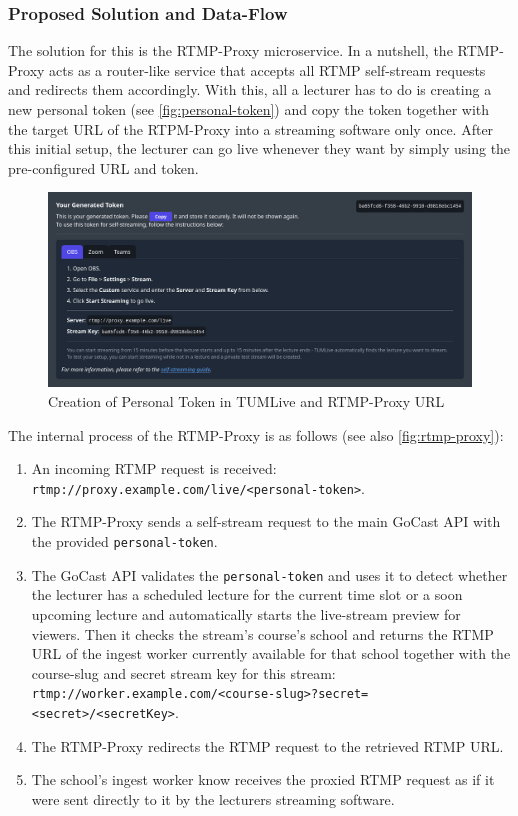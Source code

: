 \subsubsection{Proposed Solution and Data-Flow}

The solution for this is the RTMP-Proxy microservice. In a nutshell, the RTMP-Proxy acts as a router-like service that accepts all \ac{RTMP} self-stream requests and redirects them accordingly. With this, all a lecturer has to do is creating a new personal token (see \autoref{fig:personal-token}) and copy the token together with the target URL of the RTPM-Proxy into a streaming software only once.
After this initial setup, the lecturer can go live whenever they want by simply using the pre-configured URL and token.

\begin{figure}[htpb]
    \centering
    \includegraphics[width=\textwidth]{images/PersonalToken.png}
    \caption[Creation of Personal Token in TUMLive and RTMP-Proxy URL]{Creation of Personal Token in TUMLive and RTMP-Proxy URL}\label{fig:personal-token}
\end{figure}


The internal process of the RTMP-Proxy is as follows (see also \autoref{fig:rtmp-proxy}): 

\begin{enumerate}
    \item An incoming \ac{RTMP} request is received:\\
    \texttt{rtmp://proxy.example.com/live/<personal-token>}.
    \item The RTMP-Proxy sends a self-stream request to the main GoCast \ac{API} with the provided \texttt{personal-token}.
    \item The GoCast \ac{API} validates the \texttt{personal-token} and uses it to detect whether the lecturer has a scheduled lecture for the current time slot or a soon upcoming lecture and automatically starts the live-stream preview for viewers. Then it checks the stream's course's school and returns the \ac{RTMP} URL of the ingest worker currently available for that school together with the course-slug and secret stream key for this stream: \\ 
    \texttt{rtmp://worker.example.com/<course-slug>?secret=<secret>/<secretKey>}.
    \item The RTMP-Proxy redirects the \ac{RTMP} request to the retrieved \ac{RTMP} URL.
    \item The school's ingest worker know receives the proxied \ac{RTMP} request as if it were sent directly to it by the lecturers streaming software.
\end{enumerate}


